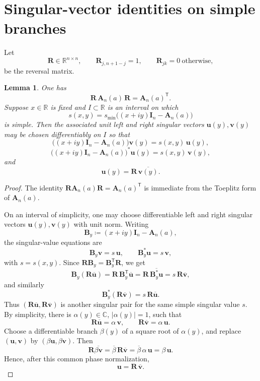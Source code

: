 \documentclass[11pt]{article}
\newtheorem{lemma}[theorem]{Lemma}
\begin{document}
\section{Singular-vector identities on simple branches}

Let
\[
\mathbf R\in\mathbb R^{n\times n},
\qquad
\mathbf R_{j,n+1-j}=1,
\qquad
\mathbf R_{jk}=0\ \text{otherwise},
\]
be the reversal matrix.

\begin{lemma}\label{lem:persymmetry}
One has
\[
\mathbf R\,\mathbf A_n(a)\,\mathbf R=\mathbf A_n(a)^{\mathsf T}.
\]
Suppose \(x\in\mathbb R\) is fixed and \(I\subset\mathbb R\) is an interval on which
\[
s(x,y)=s_{\min}\!\bigl((x+iy)\mathbf I_n-\mathbf A_n(a)\bigr)
\]
is simple. Then the associated unit left and right singular vectors \(\mathbf u(y),\mathbf v(y)\) may be chosen differentiably on \(I\) so that
\[
\bigl((x+iy)\mathbf I_n-\mathbf A_n(a)\bigr)\mathbf v(y)=s(x,y)\,\mathbf u(y),
\]
\[
\bigl((x+iy)\mathbf I_n-\mathbf A_n(a)\bigr)^*\mathbf u(y)=s(x,y)\,\mathbf v(y),
\]
and
\[
\mathbf u(y)=\mathbf R\,\overline{\mathbf v(y)}.
\]
\end{lemma}

\begin{proof}
The identity \(\mathbf R\mathbf A_n(a)\mathbf R=\mathbf A_n(a)^{\mathsf T}\) is immediate from the
Toeplitz form of \(\mathbf A_n(a)\).

On an interval of simplicity, one may choose differentiable left and right singular vectors
\(\mathbf u(y),\mathbf v(y)\) with unit norm. Writing
\[
\mathbf B_y\coloneqq (x+iy)\mathbf I_n-\mathbf A_n(a),
\]
the singular-value equations are
\[
\mathbf B_y\mathbf v=s\,\mathbf u,
\qquad
\mathbf B_y^*\mathbf u=s\,\mathbf v,
\]
with \(s=s(x,y)\). Since \(\mathbf R\mathbf B_y=\mathbf B_y^{\mathsf T}\mathbf R\), we get
\[
\mathbf B_y(\mathbf R\overline{\mathbf u})
=
\mathbf R\,\mathbf B_y^{\mathsf T}\overline{\mathbf u}
=
\mathbf R\,\overline{\mathbf B_y^*\mathbf u}
=
s\,\mathbf R\overline{\mathbf v},
\]
and similarly
\[
\mathbf B_y^*(\mathbf R\overline{\mathbf v})=s\,\mathbf R\overline{\mathbf u}.
\]
Thus \((\mathbf R\overline{\mathbf u},\mathbf R\overline{\mathbf v})\) is another singular pair for the same
simple singular value \(s\). By simplicity, there is \(\alpha(y)\in\mathbb C\), \(|\alpha(y)|=1\), such that
\[
\mathbf R\overline{\mathbf u}=\alpha\,\mathbf v,
\qquad
\mathbf R\overline{\mathbf v}=\alpha\,\mathbf u.
\]
Choose a differentiable branch \(\beta(y)\) of a square root of \(\alpha(y)\), and replace
\((\mathbf u,\mathbf v)\) by \((\beta\mathbf u,\beta\mathbf v)\). Then
\[
\mathbf R\overline{\beta\mathbf v}
=
\overline{\beta}\,\mathbf R\overline{\mathbf v}
=
\overline{\beta}\,\alpha\,\mathbf u
=
\beta\,\mathbf u.
\]
Hence, after this common phase normalization,
\[
\mathbf u=\mathbf R\,\overline{\mathbf v}.
\]
\end{proof}
\end{document}
